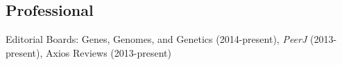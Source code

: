 \documentclass[letterpaper]{article}
\renewenvironment{itemize}{
  \begin{list}{}{
    \setlength{\leftmargin}{1.5em}
  }
}{
  \end{list}
}
\begin{document}
\begin{itemize}
\subsection*{Professional}
\item Editorial Boards: Genes, Genomes, and Genetics (2014-present), \emph{PeerJ} (2013-present), Axios Reviews (2013-present)

\end{itemize}
\end{document}
